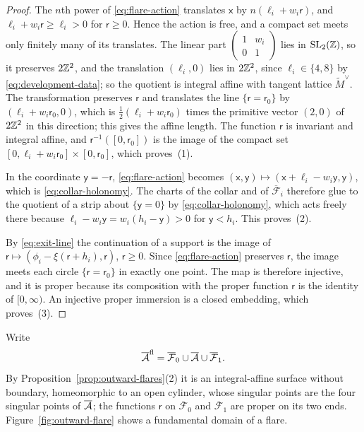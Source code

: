\begin{proof}
The $n$th power of \eqref{eq:flare-action} translates $\mathsf x$ by
$n(\ell_i+w_i\mathsf r)$, and $\ell_i+w_i\mathsf r\geq\ell_i>0$ for
$\mathsf r\geq0$.  Hence the action is free, and a compact set meets only
finitely many of its translates.  The linear part $\left(\begin{smallmatrix}1&w_i\\0&1\end{smallmatrix}\right)$
lies in $\mathrm{SL}_2(\mathbb Z)$, so it preserves $2\mathbb Z^2$, and the translation
$(\ell_i,0)$ lies in $2\mathbb Z^2$, since $\ell_i\in\{4,8\}$ by
\eqref{eq:development-data}; so the quotient is integral affine with tangent
lattice $\widetilde M^\vee$.  The transformation preserves $\mathsf r$ and
translates the line $\{\mathsf r=\mathsf r_0\}$ by
$(\ell_i+w_i\mathsf r_0,0)$, which is $\frac12(\ell_i+w_i\mathsf r_0)$
times the primitive vector $(2,0)$ of $2\mathbb Z^2$ in this direction; this gives
the affine length.  The function $\mathsf r$ is invariant and integral
affine, and $\mathsf r^{-1}([0,\mathsf r_0])$ is the image of the compact
set $[0,\ell_i+w_i\mathsf r_0]\times[0,\mathsf r_0]$, which proves~(1).

In the coordinate $\mathsf y=-\mathsf r$, \eqref{eq:flare-action} becomes
$(\mathsf x,\mathsf y)\mapsto(\mathsf x+\ell_i-w_i\mathsf y,\mathsf y)$,
which is \eqref{eq:collar-holonomy}.  The charts of the collar and of
$\overline{\mathcal F}_i$ therefore glue to the quotient of a strip about
$\{\mathsf y=0\}$ by \eqref{eq:collar-holonomy}, which acts freely there
because $\ell_i-w_i\mathsf y=w_i(h_i-\mathsf y)>0$ for $\mathsf y<h_i$.
This proves~(2).

By \eqref{eq:exit-line} the continuation of a support is the image of
$\mathsf r\mapsto(\phi_i-\xi(\mathsf r+h_i),\mathsf r)$, $\mathsf r\geq0$.
Since \eqref{eq:flare-action} preserves $\mathsf r$, the image meets each
circle $\{\mathsf r=\mathsf r_0\}$ in exactly one point.  The map is
therefore injective, and it is proper because its composition with the
proper function $\mathsf r$ is the identity of $[0,\infty)$.  An injective
proper immersion is a closed embedding, which proves~(3).
\end{proof}

Write
\[
 \overline{\mathcal A}^{\mathrm{fl}}
 =\overline{\mathcal F}_0\cup\overline{\mathcal A}\cup\overline{\mathcal F}_1 .
\]
By Proposition~\ref{prop:outward-flares}(2) it is an integral-affine surface
without boundary, homeomorphic to an open cylinder, whose singular points
are the four singular points of $\overline{\mathcal A}$; the functions $\mathsf r$
on $\overline{\mathcal F}_0$ and $\overline{\mathcal F}_1$ are proper on its
two ends.  Figure~\ref{fig:outward-flare} shows a fundamental domain of a
flare.

